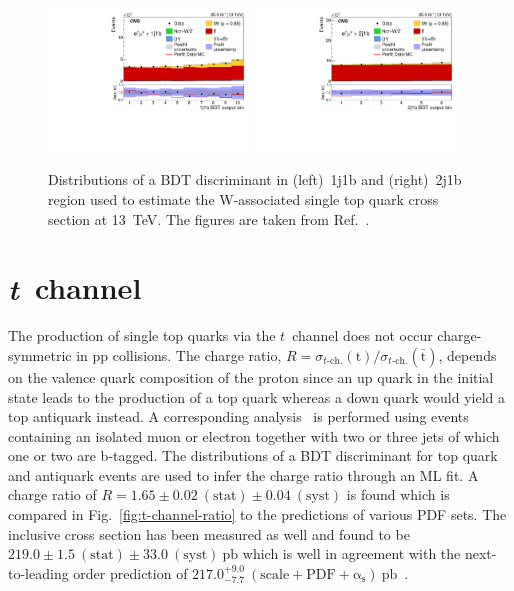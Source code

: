 \documentclass{PoS}
\begin{document}
\begin{figure}[!htb]
\begin{center}
\includegraphics[width=0.48\textwidth]{tw2.pdf}\hspace{0.02\textwidth}
\includegraphics[width=0.48\textwidth]{tw3.pdf}
\caption{\label{fig:tw-channel-bdt}Distributions of a BDT discriminant in (left)~1j1b and (right)~2j1b region used to estimate the W-associated single top quark cross section at 13~TeV. The figures are taken from Ref.~\cite{tWch}.}
\end{center}
\end{figure}

\section{\textit{t}~channel}

The production of single top quarks via the $t$~channel does not occur charge-symmetric in pp collisions. The charge ratio, $R=\sigma_{t\mbox{-}\mathrm{ch.}}({\mathrm{t}})/\sigma_{t\mbox{-}\mathrm{ch.}}({\bar{\mathrm{t}}})$, depends on the valence quark composition of the proton since an up quark in the initial state leads to the production of a top quark whereas a down quark would yield a top antiquark instead. A corresponding analysis~\cite{tch} is performed using events containing an isolated muon or electron together with two or three jets of which one or two are b-tagged. The distributions of a BDT discriminant for top quark and antiquark events are used to infer the charge ratio through an ML fit. A charge ratio of $R=1.65\pm0.02~\mathrm{(stat)}\pm0.04~\mathrm{(syst)}$ is found which is compared in Fig.~\ref{fig:t-channel-ratio} to the predictions of various PDF sets. The inclusive cross section has been measured as well and found to be $219.0\pm1.5~\mathrm{(stat)}\pm33.0~\mathrm{(syst)}~\mathrm{pb}$ which is well in agreement with the next-to-leading order prediction of $217.0^{+9.0}_{-7.7}~\mathrm{(scale+PDF+\alpha_s)}~\mathrm{pb}$~\cite{hathor}.
 
\end{document}
